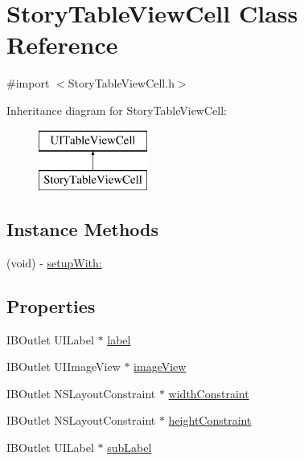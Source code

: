\hypertarget{interface_story_table_view_cell}{}\section{Story\+Table\+View\+Cell Class Reference}
\label{interface_story_table_view_cell}


{\ttfamily \#import $<$Story\+Table\+View\+Cell.\+h$>$}

Inheritance diagram for Story\+Table\+View\+Cell\+:\begin{figure}[H]
\begin{center}
\leavevmode
\includegraphics[height=2.000000cm]{interface_story_table_view_cell}
\end{center}
\end{figure}
\subsection*{Instance Methods}
\begin{DoxyCompactItemize}
\item 
(void) -\/ \hyperlink{interface_story_table_view_cell_a2a9abe025f50c495bc61fe0671afec91}{setup\+With\+:}
\end{DoxyCompactItemize}
\subsection*{Properties}
\begin{DoxyCompactItemize}
\item 
I\+B\+Outlet U\+I\+Label $\ast$ \hyperlink{interface_story_table_view_cell_a79458e3fc3760a833c179ca694755e3f}{label}
\item 
I\+B\+Outlet U\+I\+Image\+View $\ast$ \hyperlink{interface_story_table_view_cell_a8a4a2e33924e723282d9d50a75c28836}{image\+View}
\item 
I\+B\+Outlet N\+S\+Layout\+Constraint $\ast$ \hyperlink{interface_story_table_view_cell_a6319661885c9659a1ca4854a27ff1088}{width\+Constraint}
\item 
I\+B\+Outlet N\+S\+Layout\+Constraint $\ast$ \hyperlink{interface_story_table_view_cell_ac0b115430ddf0baf14a2f6865222a534}{height\+Constraint}
\item 
I\+B\+Outlet U\+I\+Label $\ast$ \hyperlink{interface_story_table_view_cell_a9856d0cd32c88868e4af180807ba90a2}{sub\+Label}
\end{DoxyCompactItemize}


